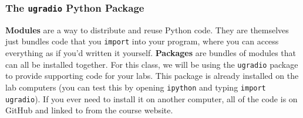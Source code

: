 \documentclass[12pt,preprint]{aastex}
\begin{document}
%
%
%
%
%
\subsubsection{The {\tt ugradio} Python Package}

\noindent
{\bf Modules} are a way to distribute and reuse Python code.  They are themselves
just bundles code that you {\tt import} into your program, where you can
access everything as if you'd written it yourself.  {\bf Packages} are bundles
of modules that can all be installed together.  For this class, we will be using
the {\tt ugradio} package to provide supporting code for your labs.  This package
is already installed on the lab computers (you can test this by opening {\tt ipython}
and typing {\tt import ugradio}).  If you ever need to install it on another computer,
all of the code is on GitHub and linked to from the course website.  
\end{document}
